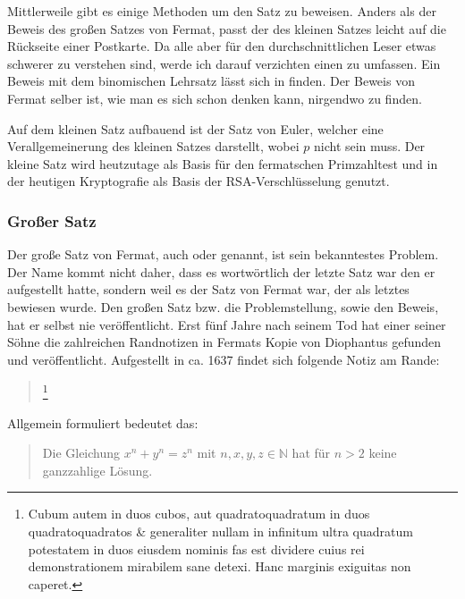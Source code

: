 Mittlerweile gibt es einige Methoden um den Satz zu beweisen. Anders als der Beweis des großen Satzes von Fermat, passt der des kleinen Satzes leicht auf die Rückseite einer Postkarte. Da alle aber für den durchschnittlichen Leser etwas schwerer zu verstehen sind, werde ich darauf verzichten einen zu umfassen. Ein Beweis mit dem binomischen Lehrsatz lässt sich in \cite{wolframFlT} finden. Der Beweis von Fermat selber ist, wie man es sich schon denken kann, nirgendwo zu finden.

Auf dem kleinen Satz aufbauend ist der Satz von Euler, welcher eine Verallgemeinerung des kleinen Satzes darstellt, wobei $p$ nicht  sein muss. Der kleine Satz wird heutzutage als Basis für den fermatschen Primzahltest und in der heutigen Kryptografie als Basis der RSA-Verschlüsselung genutzt.

\subsubsection{Großer Satz} \label{sec:grSatz}
Der große Satz von Fermat, auch  oder  genannt, ist sein bekanntestes Problem. Der Name  kommt nicht daher, dass es wortwörtlich der letzte Satz war den er aufgestellt hatte, sondern weil es der Satz von Fermat war, der als letztes bewiesen wurde. Den großen Satz bzw. die Problemstellung, sowie den Beweis, hat er selbst nie veröffentlicht. Erst fünf Jahre nach seinem Tod hat einer seiner Söhne die zahlreichen Randnotizen in Fermats Kopie von Diophantus  gefunden und veröffentlicht. Aufgestellt in ca. 1637 findet sich folgende Notiz am Rande:

\begin{quote}
    \textit{}
    \footnote{Cubum autem in duos cubos, aut quadratoquadratum in duos quadratoquadratos \& generaliter nullam in infinitum ultra quadratum potestatem in duos eiusdem nominis fas est dividere cuius rei demonstrationem mirabilem sane detexi. Hanc marginis exiguitas non caperet.}
\end{quote}

Allgemein formuliert bedeutet das:
\begin{quote}
    Die Gleichung $x^n + y^n = z^n$ mit $n,x,y,z \in \mathbb{N}$ hat für $n>2$ keine ganzzahlige Lösung.
\end{quote}

